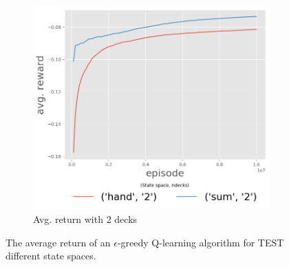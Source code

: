 \begin{figure}[htp]
\begin{subfigure}[b]{0.48\textwidth}
  	 \includegraphics[width=\textwidth]{./figures/avgReturnEp_ndeck2.png}
   \caption{Avg. return with 2 decks\label{sfig:3Dfignd8}}
 \end{subfigure}
\caption{The average return of an $\epsilon$-greedy Q-learning algorithm for TEST different state spaces. \label{fig:q_vals_states}}
\end{figure}